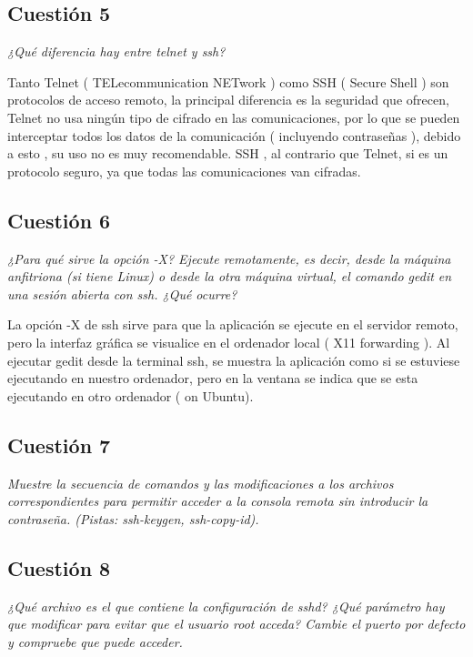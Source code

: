 \subsection{Cuestión 5}
\textit{¿Qué diferencia hay entre telnet y ssh?}
\newline

Tanto Telnet ( TELecommunication NETwork ) como SSH ( Secure Shell ) son protocolos de acceso remoto, la principal diferencia es la seguridad que ofrecen, Telnet no usa ningún tipo de cifrado en las comunicaciones, por lo que se pueden interceptar todos los datos de la comunicación ( incluyendo contraseñas ), debido a esto , su uso no es muy recomendable. SSH , al contrario que Telnet, si es un protocolo seguro, ya que todas las comunicaciones van cifradas.  \cite{sshtle}

\subsection{Cuestión 6}
\textit{¿Para qué sirve la opción -X? Ejecute remotamente, es decir, desde la máquina anfitriona (si tiene Linux) o desde la otra máquina virtual, el comando gedit en una sesión abierta con ssh. ¿Qué ocurre?}
\newline

La opción -X de ssh sirve para que la aplicación se ejecute en el servidor remoto, pero la interfaz gráfica se visualice en el ordenador local ( X11 forwarding ). \cite{sshx} Al ejecutar gedit desde la terminal ssh, se muestra la aplicación como si se estuviese ejecutando en nuestro ordenador, pero en la ventana se indica que se esta ejecutando en otro ordenador ( on Ubuntu). 

\subsection{Cuestión 7}
\textit{Muestre la secuencia de comandos y las modificaciones a los archivos correspondientes para permitir acceder a la consola remota sin introducir la contraseña. (Pistas: ssh-keygen, ssh-copy-id).}
\newline
\subsection{Cuestión 8}
\textit{¿Qué archivo es el que contiene la configuración de sshd? ¿Qué parámetro hay que modificar para evitar que el usuario root acceda? Cambie el puerto por defecto y compruebe que puede acceder.}

